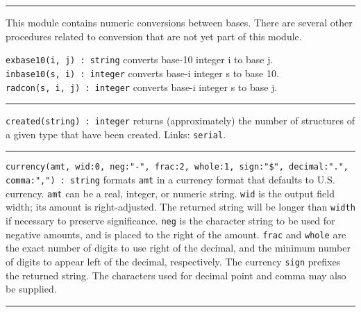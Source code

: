 


\vspace{0.25cm}\hrule{}

This module contains numeric conversions between
bases. There are several other procedures related
to conversion that are not yet part of this module. 

\texttt{exbase10(i, j) : string} converts base-10 integer i to base
j.\\
\texttt{inbase10(s, i) : integer} converts base-i integer s to base
10.\\
\texttt{radcon(s, i, j) : integer} converts base-i integer s to base j.

\vspace{0.25cm}\hrule{}

\texttt{created(string) : integer} returns (approximately) the number of
structures of a given type that have been created. Links: \texttt{serial}. 

\vspace{0.25cm}\hrule{}

\texttt{currency(amt, wid:0, neg:"-",
frac:2, whole:1, sign:"\$",
decimal:".",
comma:",") : string} formats \texttt{amt}
in a currency format that defaults to U.S. currency. \texttt{amt} can
be a real, integer, or numeric string. \texttt{wid} is the output field
width; its amount is right-adjusted. The returned string will
be longer than \texttt{width} if necessary to preserve significance.
\texttt{neg} is the character string to be used for negative amounts,
and is placed to the right of the amount. \texttt{frac} and
\texttt{whole} are the exact number of digits to use right of the
decimal, and the minimum number of digits to appear left of the
decimal, respectively. The currency \texttt{sign} prefixes the returned
string. The characters used for decimal point and comma may also be
supplied.

\vspace{0.25cm}\hrule{}

